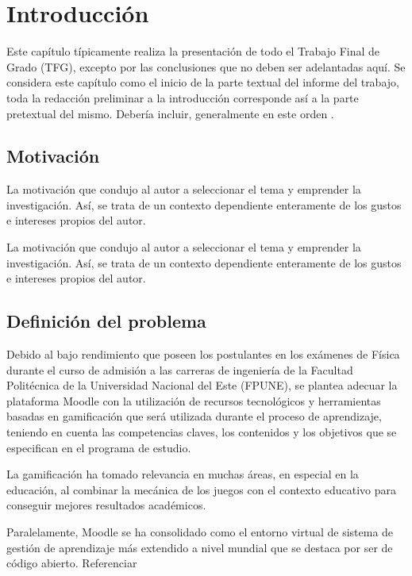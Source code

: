 \fancyhead{}
\fancyfoot{}
\cfoot{\thepage}

\chapter{Introducción}

Este capítulo típicamente realiza la presentación de todo el Trabajo Final de Grado (TFG), excepto por las conclusiones que no deben ser adelantadas aquí. Se considera este capítulo como el inicio de la parte textual del informe del trabajo, toda la redacción preliminar a la introducción corresponde así a la parte pretextual del mismo. Debería incluir, generalmente en este orden \cite{sampieri}.

\section{Motivación}
La motivación que condujo al autor a seleccionar el tema y emprender la investigación. Así, se trata de un contexto dependiente enteramente de los gustos e intereses propios del autor.

La motivación que condujo al autor a seleccionar el tema y emprender la investigación. Así, se trata de un contexto dependiente enteramente de los gustos e intereses propios del autor.

\section{Definición del problema}
Debido al bajo rendimiento que poseen los postulantes en los exámenes de Física durante el curso de admisión a las carreras de ingeniería de la Facultad Politécnica de la Universidad Nacional del Este (FPUNE), se plantea adecuar la plataforma Moodle con la utilización de recursos tecnológicos y herramientas basadas en gamificación que será utilizada durante el proceso de aprendizaje, teniendo en cuenta las competencias claves, los contenidos y los objetivos que se especifican en el programa de estudio.

La gamificación ha tomado relevancia en muchas áreas, en especial en la educación, al combinar la mecánica de los juegos con el contexto educativo para conseguir mejores resultados académicos.

Paralelamente, Moodle se ha consolidado como el entorno virtual de sistema de gestión de aprendizaje más extendido a nivel mundial que se destaca por ser de código abierto. Referenciar
 
